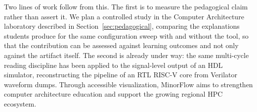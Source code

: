 \documentclass[runningheads,a4paper]{llncs}
\begin{document}
Two lines of work follow from this. The first is to measure the pedagogical claim rather than assert it. We plan a controlled study in the Computer Architecture laboratory described in Section~\ref{sec:pedagogical}, comparing the explanations students produce for the same configuration sweep with and without the tool, so that the contribution can be assessed against learning outcomes and not only against the artifact itself. The second is already under way: the same multi-cycle reading discipline has been applied to the signal-level output of an HDL simulator, reconstructing the pipeline of an RTL RISC-V core from Verilator waveform dumps. Through accessible visualization, MinorFlow aims to strengthen computer architecture education and support the growing regional HPC ecosystem. 


\begingroup
{}

\endgroup
\end{document}
